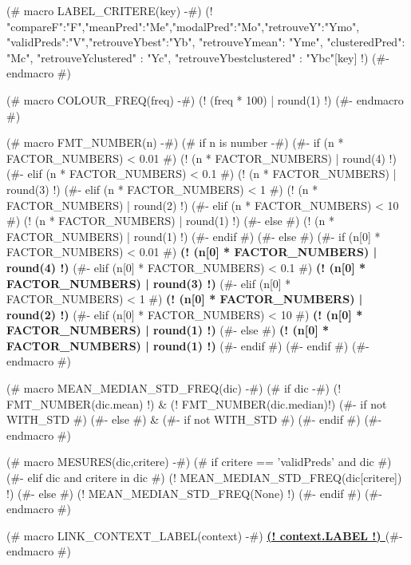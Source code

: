 (# macro LABEL_CRITERE(key) -#)
{\small (! {"compareF":"F","meanPred":"Me","modalPred":"Mo","retrouveY":"Ymo",
"validPreds":"V","retrouveYbest":"Yb", "retrouveYmean": "Yme", "clusteredPred": "Mc",
"retrouveYclustered" : "Yc", "retrouveYbestclustered" : "Ybc"}[key] !)  }
(#- endmacro #)

(# macro COLOUR_FREQ(freq) -#)
\textcolor[rgb]{ (! (2 * (1.1 - freq))  | round(3) | truncate01 !) , (! (2 * freq - 1.3) | round(3) | truncate01 !) , 0.1}{(! (freq * 100) | round(1) !)}
(#- endmacro #)

(# macro FMT_NUMBER(n) -#)
(# if n is number -#)
(#- if (n  * FACTOR_NUMBERS) < 0.01 #)
(! (n  * FACTOR_NUMBERS) | round(4) !)
(#- elif (n  * FACTOR_NUMBERS) < 0.1 #)
(! (n  * FACTOR_NUMBERS) | round(3) !)
(#- elif (n  * FACTOR_NUMBERS) < 1 #)
(! (n  * FACTOR_NUMBERS) | round(2) !)
(#- elif (n  * FACTOR_NUMBERS) < 10 #)
(! (n  * FACTOR_NUMBERS) | round(1) !)
(#- else #)
(! (n  * FACTOR_NUMBERS) | round(1) !)
(#- endif #)
(#- else #)
(#- if (n[0] * FACTOR_NUMBERS) < 0.01 #)
\textbf{ (! (n[0] * FACTOR_NUMBERS) | round(4) !)}
(#- elif (n[0] * FACTOR_NUMBERS) < 0.1 #)
\textbf{ (! (n[0] * FACTOR_NUMBERS) | round(3) !)}
(#- elif (n[0] * FACTOR_NUMBERS) < 1 #)
\textbf{ (! (n[0] * FACTOR_NUMBERS) | round(2) !)}
(#- elif (n[0] * FACTOR_NUMBERS) < 10 #)
\textbf{ (! (n[0] * FACTOR_NUMBERS) | round(1) !)}
(#- else #)
\textbf{ (! (n[0] * FACTOR_NUMBERS) | round(1) !)}
(#- endif #)
(#- endif #)
(#- endmacro #)


(# macro MEAN_MEDIAN_STD_FREQ(dic) -#)
(# if dic -#)
(! FMT_NUMBER(dic.mean) !) & {\footnotesize (! FMT_NUMBER(dic.median)!) } (#- if not WITH_STD #) %
(#- else #)
& (#- if not WITH_STD #) %
(#- endif #)
(#- endmacro #)


(# macro MESURES(dic,critere) -#)
(# if critere == 'validPreds' and dic #)
(#- elif dic and critere in dic #)
    (!  MEAN_MEDIAN_STD_FREQ(dic[critere]) !)
(#- else #)
(! MEAN_MEDIAN_STD_FREQ(None) !)
(#- endif #)
(#- endmacro #)


(# macro LINK_CONTEXT_LABEL(context) -#)
\textbf{ \hyperref[contexts]{ (! context.LABEL !) }}
(#- endmacro #)
